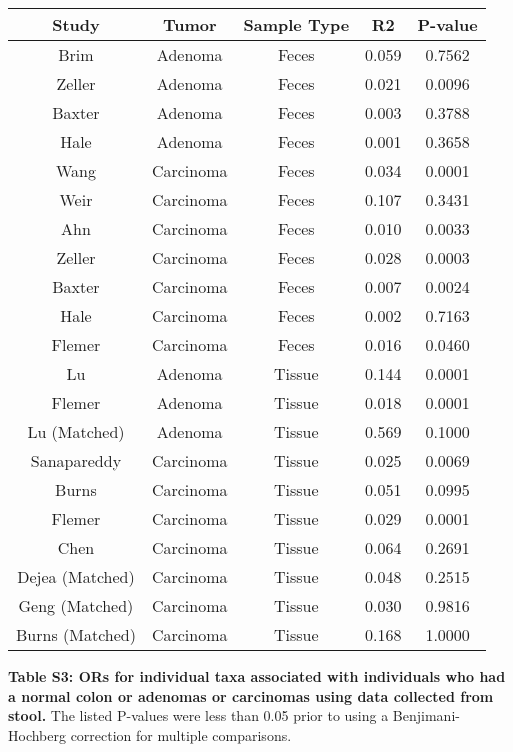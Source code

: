 \documentclass[12pt,]{article}
\begin{document}
\begin{longtable}[]{@{}ccccc@{}}
\toprule
Study & Tumor & Sample Type & R2 & P-value\tabularnewline
\midrule
\endhead
Brim & Adenoma & Feces & 0.059 & 0.7562\tabularnewline
Zeller & Adenoma & Feces & 0.021 & 0.0096\tabularnewline
Baxter & Adenoma & Feces & 0.003 & 0.3788\tabularnewline
Hale & Adenoma & Feces & 0.001 & 0.3658\tabularnewline
Wang & Carcinoma & Feces & 0.034 & 0.0001\tabularnewline
Weir & Carcinoma & Feces & 0.107 & 0.3431\tabularnewline
Ahn & Carcinoma & Feces & 0.010 & 0.0033\tabularnewline
Zeller & Carcinoma & Feces & 0.028 & 0.0003\tabularnewline
Baxter & Carcinoma & Feces & 0.007 & 0.0024\tabularnewline
Hale & Carcinoma & Feces & 0.002 & 0.7163\tabularnewline
Flemer & Carcinoma & Feces & 0.016 & 0.0460\tabularnewline
Lu & Adenoma & Tissue & 0.144 & 0.0001\tabularnewline
Flemer & Adenoma & Tissue & 0.018 & 0.0001\tabularnewline
Lu (Matched) & Adenoma & Tissue & 0.569 & 0.1000\tabularnewline
Sanapareddy & Carcinoma & Tissue & 0.025 & 0.0069\tabularnewline
Burns & Carcinoma & Tissue & 0.051 & 0.0995\tabularnewline
Flemer & Carcinoma & Tissue & 0.029 & 0.0001\tabularnewline
Chen & Carcinoma & Tissue & 0.064 & 0.2691\tabularnewline
Dejea (Matched) & Carcinoma & Tissue & 0.048 & 0.2515\tabularnewline
Geng (Matched) & Carcinoma & Tissue & 0.030 & 0.9816\tabularnewline
Burns (Matched) & Carcinoma & Tissue & 0.168 & 1.0000\tabularnewline
\bottomrule
\end{longtable}

\newpage

\textbf{Table S3: ORs for individual taxa associated with individuals
who had a normal colon or adenomas or carcinomas using data collected
from stool.} The listed P-values were less than 0.05 prior to using a
Benjimani-Hochberg correction for multiple comparisons.

\scriptsize
\end{document}
